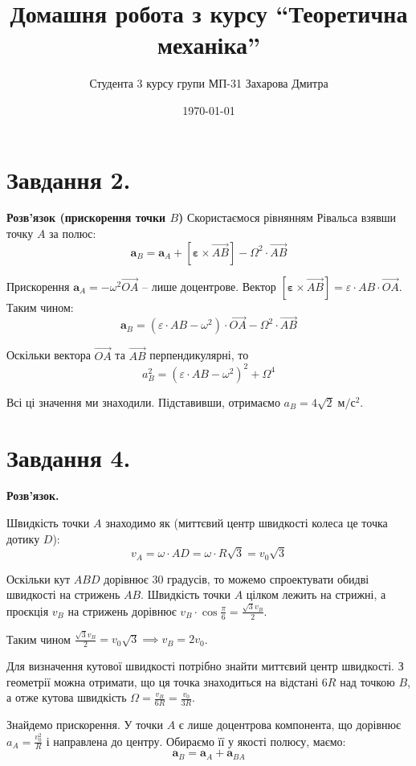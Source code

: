 \documentclass[12pt]{extarticle}
\title{Домашня робота з курсу ``Теоретична механіка''}
\author{Студента 3 курсу групи МП-31 Захарова Дмитра}
\date{\today}
\begin{document}
\maketitle

\section*{Завдання 2.}

\textbf{Розв'язок (прискорення точки $B$)} Скористаємося рівнянням Рівальса взявши точку $A$ за полюс:
\[
\boldsymbol{a}_B = \boldsymbol{a}_A + [\boldsymbol{\varepsilon} \times \vec{AB}] - \Omega^2 \cdot \vec{AB}
\]

Прискорення $\boldsymbol{a}_A = -\omega^2\vec{OA}$ -- лише доцентрове. Вектор $[\boldsymbol{\varepsilon} \times \vec{AB}] = \varepsilon \cdot AB \cdot \vec{OA}$. Таким чином:
\[
\boldsymbol{a}_B = (\varepsilon \cdot AB - \omega^2) \cdot \vec{OA} - \Omega^2 \cdot \vec{AB}
\]

Оскільки вектора $\vec{OA}$ та $\vec{AB}$ перпендикулярні, то
\[
a_B^2 = (\varepsilon \cdot AB - \omega^2)^2 + \Omega^4
\]

Всі ці значення ми знаходили. Підставивши, отримаємо $a_B = 4\sqrt{2} \; \text{м}/\text{с}^2$.

\section*{Завдання 4.}

\textbf{Розв'язок.} 

Швидкість точки $A$ знаходимо як (миттєвий центр швидкості колеса це точка дотику $D$):
\[
v_A = \omega \cdot AD = \omega \cdot R \sqrt{3} = v_0\sqrt{3}
\]

Оскільки кут $ABD$ дорівнює $30$ градусів, то можемо спроектувати обидві швидкості на стрижень $AB$. Швидкість точки $A$ цілком лежить на стрижні, а проєкція $v_B$ на стрижень дорівнює $v_B \cdot \cos \frac{\pi}{6} = \frac{\sqrt{3}v_B}{2}$. 

Таким чином $\frac{\sqrt{3}v_B}{2} = v_0\sqrt{3} \implies v_B = 2v_0$. 

Для визначення кутової швидкості потрібно знайти миттєвий центр швидкості. З геометрії можна отримати, що ця точка знаходиться на відстані $6R$ над точкою $B$, а отже кутова швидкість $\Omega = \frac{v_B}{6R} = \frac{v_0}{3R}$. 

Знайдемо прискорення. У точки $A$ є лише доцентрова компонента, що дорівнює $a_A = \frac{v_0^2}{R}$ і направлена до центру. Обираємо її у якості полюсу, маємо:
\[
\boldsymbol{a}_B = \boldsymbol{a}_A + \boldsymbol{a}_{BA}
\]
\end{document}
